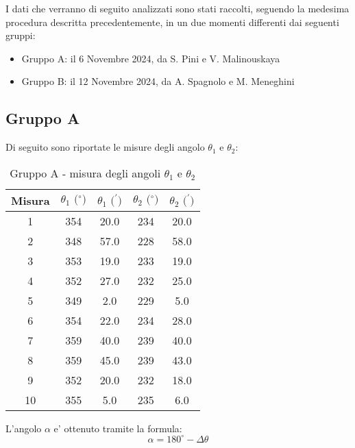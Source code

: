 I dati che verranno di seguito analizzati sono stati raccolti, seguendo la medesima procedura descritta precedentemente, in un due momenti differenti dai seguenti gruppi:
\begin{itemize}
	\item Gruppo A: il 6 Novembre 2024, da S. Pini e V. Malinouskaya
	\item Gruppo B: il 12 Novembre 2024, da A. Spagnolo e M. Meneghini
\end{itemize}

\subsection{Gruppo A}
Di seguito sono riportate le misure degli angolo $\theta_1$ e $\theta_2$:
\begin{table}[!htbp]
    {\par\centering
    \begin{tabular}{ccccc}
        \hline
        Misura & $\theta_1 \text{ ($^{\circ}$)}$ & $\theta_1 \text{ ($^{\prime}$)}$ & $\theta_2 \text{ ($^{\circ}$)}$ & $\theta_2 \text{ ($^{\prime}$)}$ \\
        \hline
        1   &	354	&	20.0	&	234	&	20.0\\
        2	&	348	&	57.0	&	228	&	58.0\\
        3	&	353	&	19.0	&	233	&	19.0\\
        4	&	352	&	27.0	&	232	&	25.0\\
        5	&	349	&	2.0	&	229	&	5.0\\
        6	&	354	&	22.0	&	234	&	28.0\\
        7	&	359	&	40.0	&	239	&	40.0\\
        8	&	359	&	45.0	&	239	&	43.0\\
        9	&	352	&	20.0	&	232	&	18.0\\
        10	&	355	&	5.0	&	235	&	6.0\\
        \hline
    \end{tabular}
    \par}
    \caption{Gruppo A - misura degli angoli $\theta_1$ e $\theta_2$}
\end{table}


L'angolo $\alpha$ e' ottenuto tramite la formula:
\[
	\alpha = 180^{\circ} - \Delta \theta
\]

